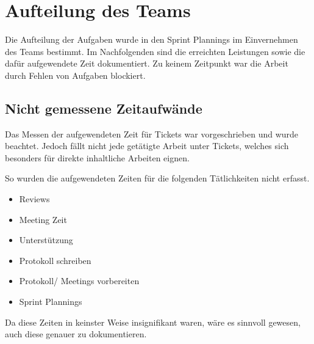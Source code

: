 \newcommand{\trWork}[6]
{
    \multicolumn{1}{|l|}{\textbf{\begin{tabular}[c]{@{}l@{}}#1\end{tabular}}} &
    \multicolumn{1}{l|}{\begin{tabular}[c]{@{}l@{}}#2\end{tabular}} &
    \multicolumn{1}{l|}{#3} &
    \\ \cline{1-3}
    \begin{tabular}[c]{@{}l@{}}#4\end{tabular} &
    \multicolumn{2}{l}{\begin{tabular}[c]{@{}l@{}}#5\end{tabular}} &
    \multirow{\begin{tabular}[c]{@{}l@{}}#6\end{tabular}} \\ \hline
}
\newcommand{\gitIssue}[1]
{
    \href{https://github.com/MaxTrautwein/AStA-Digital-Forms/issues/#1}{Issue #1}
}
\newcommand{\gitPull}[1]
{
    \href{https://github.com/MaxTrautwein/AStA-Digital-Forms/pull/#1}{PR #1}
}
\newcommand{\gitCommit}[2]
{
    \href{https://github.com/MaxTrautwein/AStA-Digital-Forms/pull/#1/commits/#2}{\StrLeft{#2}{10}}
}

\chapter{Aufteilung des Teams}\label{ch:aufteilung-des-teams}
Die Aufteilung der Aufgaben wurde in den Sprint Plannings im Einvernehmen des Teams bestimmt.
Im Nachfolgenden sind die erreichten Leistungen sowie die dafür aufgewendete Zeit dokumentiert.
Zu keinem Zeitpunkt war die Arbeit durch Fehlen von Aufgaben blockiert.

\section{Nicht gemessene Zeitaufwände}\label{sec:nicht-gemessene-zeitaufwande}
Das Messen der aufgewendeten Zeit für Tickets war vorgeschrieben und wurde beachtet.
Jedoch fällt nicht jede getätigte Arbeit unter Tickets, welches sich besonders für direkte inhaltliche Arbeiten eignen.

So wurden die aufgewendeten Zeiten für die folgenden Tätlichkeiten nicht erfasst.
\begin{itemize}
    \item Reviews
    \item Meeting Zeit
    \item Unterstützung
    \item Protokoll schreiben
    \item Protokoll/ Meetings vorbereiten
    \item Sprint Plannings
\end{itemize}
Da diese Zeiten in keinster Weise insignifikant waren, wäre es sinnvoll gewesen, auch diese genauer zu dokumentieren.

